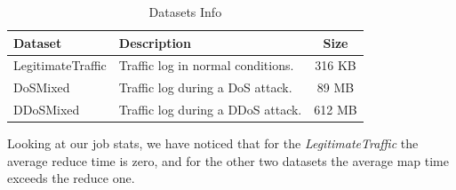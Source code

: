 \begin{table}[!htbp]
\centering
\begin{tabular}{|l|l|c|}
\hline
\textbf{Dataset} & \textbf{Description}                              & \textbf{Size} \\ \hline
LegitimateTraffic         & Traffic log in normal conditions. & 316 KB        \\ 
DoSMixed        & Traffic log during a DoS attack.                   & 89 MB       \\ 
DDoSMixed        & Traffic log during a DDoS attack. & 612 MB        \\ \hline
\end{tabular}
\caption{Datasets Info}
\label{tab:dataset_info}
\end{table}

Looking at our job stats, we have noticed that for the \textit{LegitimateTraffic} the average reduce time is zero, and for the other two datasets the average map time exceeds the reduce one.

